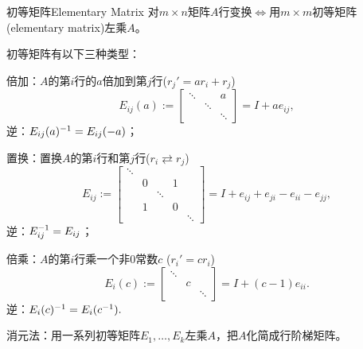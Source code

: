 \begin{definition}{初等矩阵}{Elementary Matrix}
	对$m\times n$矩阵$A$行变换$\iff$用$m\times m$初等矩阵(elementary matrix)左乘$A$。
	
	初等矩阵有以下三种类型：
	\begin{compactitem}
		\item 倍加：$A$的第$i$行的$a$倍加到第$j$行($r_j'=ar_i+r_j$)
		\[
			E_{ij}(a):=
			\begin{bmatrix}
				\ddots&&a\\ &\ddots\\ &&\ddots
			\end{bmatrix}=I+ae_{ij},
		\]
		逆：$E_{ij}(a)^{-1}=E_{ij}(-a)$；
		\item 置换：置换$A$的第$i$行和第$j$行($r_i\rightleftarrows r_j$)
		\[
			E_{ij}:=
			\begin{bmatrix}
				\ddots\\ &0&&1\\ &&\ddots\\ &1&&0\\ &&&&\ddots
			\end{bmatrix}=I+e_{ij}+e_{ji}-e_{ii}-e_{jj},
		\]
		逆：$E_{ij}^{-1}=E_{ij}$；
		\item 倍乘：$A$的第$i$行乘一个非0常数$c$ ($r_i'=cr_i$)
		\[
			E_i(c):=
			\begin{bmatrix}
				\ddots\\ &c\\ &&\ddots
			\end{bmatrix}=I+(c-1)e_{ii}.
		\]
		逆：$E_i(c)^{-1}=E_i(c^{-1}).$
	\end{compactitem}
\end{definition}
消元法：用一系列初等矩阵$E_1,\ldots,E_k$左乘$A$，把$A$化简成行阶梯矩阵。
